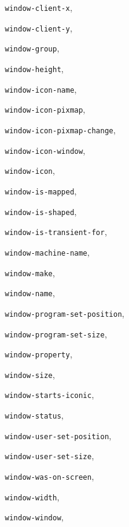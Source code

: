 \begin{theindex}
\item {\tt window-client-x}, {\bf\pageref{window-client-x}}
\item {\tt window-client-y}, {\bf\pageref{window-client-y}}
\item {\tt window-group}, {\bf\pageref{window-group}}
\item {\tt window-height}, {\bf\pageref{window-height}}
\item {\tt window-icon-name}, {\bf\pageref{window-icon-name}}
\item {\tt window-icon-pixmap}, {\bf\pageref{window-icon-pixmap}}
\item {\tt window-icon-pixmap-change}, {\bf\pageref{window-icon-pixmap-change}}
\item {\tt window-icon-window}, {\bf\pageref{window-icon-window}}
\item {\tt window-icon}, {\bf\pageref{window-icon}}
\item {\tt window-is-mapped}, {\bf\pageref{window-is-mapped}}
\item {\tt window-is-shaped}, {\bf\pageref{window-is-shaped}}
\item {\tt window-is-transient-for}, {\bf\pageref{window-is-transient-for}}
\item {\tt window-machine-name}, {\bf\pageref{window-machine-name}}
\item {\tt window-make}, {\bf\pageref{window-make}}
\item {\tt window-name}, {\bf\pageref{window-name}}
\item {\tt window-program-set-position}, {\bf\pageref{window-program-set-position}}
\item {\tt window-program-set-size}, {\bf\pageref{window-program-set-size}}
\item {\tt window-property}, {\bf\pageref{window-property}}
\item {\tt window-size}, {\bf\pageref{window-size}}
\item {\tt window-starts-iconic}, {\bf\pageref{window-starts-iconic}}
\item {\tt window-status}, {\bf\pageref{window-status}}
\item {\tt window-user-set-position}, {\bf\pageref{window-user-set-position}}
\item {\tt window-user-set-size}, {\bf\pageref{window-user-set-size}}
\item {\tt window-was-on-screen}, {\bf\pageref{window-was-on-screen}}
\item {\tt window-width}, {\bf\pageref{window-width}}
\item {\tt window-window}, {\bf\pageref{window-window}}

\end{theindex}
